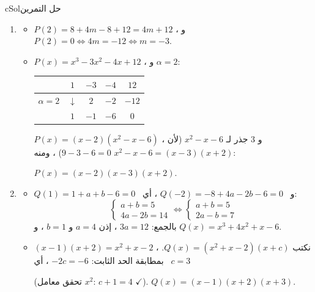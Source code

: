 \documentclass[12pt,a4paper]{article}
\newcounter{exo}
\newenvironment{hal}{\Needspace{12\baselineskip}\begin{otherlanguage}{english}\begin{arbox}[breakable]{cSol}{حل التمرين \theexo}}{\end{arbox}\end{otherlanguage}}
\newenvironment{LTR}{\begin{otherlanguage}{english}}{\end{otherlanguage}}
\begin{document}
\begin{hal}
\begin{enumerate}
\item \begin{itemize}
\item[(أ)] $P(2)=8+4m-8+12=4m+12$ ، و $P(2)=0\iff4m=-12\iff\boxed{m=-3}$.
\item[(ب)] $P(x)=x^3-3x^2-4x+12$ ، و $\alpha=2$:
\begin{center}
\begin{LTR}
\renewcommand{\arraystretch}{1.5}
\begin{tabular}{|c|c|c|c|c|}\hline
\cellcolor{cDef!15} & \cellcolor{cDef!15}$1$ & \cellcolor{cDef!15}$-3$ & \cellcolor{cDef!15}$-4$ & \cellcolor{cDef!15}$12$\\\hline
\cellcolor{cEx!25}$\alpha=2$ & $\downarrow$ & $2$ & $-2$ & $-12$\\\hline
 & \cellcolor{cSol!15}$1$ & \cellcolor{cSol!15}$-1$ & \cellcolor{cSol!15}$-6$ & \cellcolor{cThm!20}$0$\\\hline
\end{tabular}
\end{LTR}
\end{center}
$P(x)=(x-2)\left(x^2-x-6\right)$ ، و $3$ جذر لـ $x^2-x-6$ (لأن $9-3-6=0$) ، ومنه $x^2-x-6=(x-3)(x+2)$:\par
$\boxed{P(x)=(x-2)(x-3)(x+2)}$.
\end{itemize}
\item \begin{itemize}
\item[(أ)] $Q(1)=1+a+b-6=0$ \ و \ $Q(-2)=-8+4a-2b-6=0$ ، أي:
\[\begin{cases}a+b=5\\ 4a-2b=14\end{cases}\iff\begin{cases}a+b=5\\ 2a-b=7\end{cases}\]
بالجمع: $3a=12$ ، إذن $\boxed{a=4}$ و $\boxed{b=1}$ ، و $Q(x)=x^3+4x^2+x-6$.
\item[(ب)] $(x-1)(x+2)=x^2+x-2$ ، نكتب $Q(x)=\left(x^2+x-2\right)(x+c)$. \ بمطابقة الحد الثابت: $-2c=-6$ ، أي $c=3$\par
(تحقق معامل $x^2$: $c+1=4$ $\checkmark$). \quad $\boxed{Q(x)=(x-1)(x+2)(x+3)}$.
\end{itemize}
\end{enumerate}
\end{hal}
\end{document}
